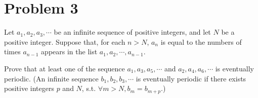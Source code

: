 \documentclass{Math_Note}
\begin{document}
\section*{Problem 3}
\begin{prb}
    Let $a_{1}, a_{2}, a_{3}, \cdots$ be an infinite sequence of positive integers, and let $N$ be a positive integer. Suppose that, for each $n>N$, 
    $a_{n}$ is equal to the numbers of times $a_{n-1}$ appears in the list $a_{1}, a_{2}, \cdots, a_{n-1}$.

    Prove that at least one of the sequence $a_{1}, a_{3}, a_{5}, \cdots$ and $a_{2}, a_{4}, a_{6}, \cdots$ is eventually periodic. (An infinite sequence 
    $b_{1}, b_{2}, b_{3}, \cdots$ is eventually periodic if there exists positive integers $p$ and $N$, s.t. $\forall m>N, b_{m}=b_{m+p}$.)
\end{prb}
\end{document}

